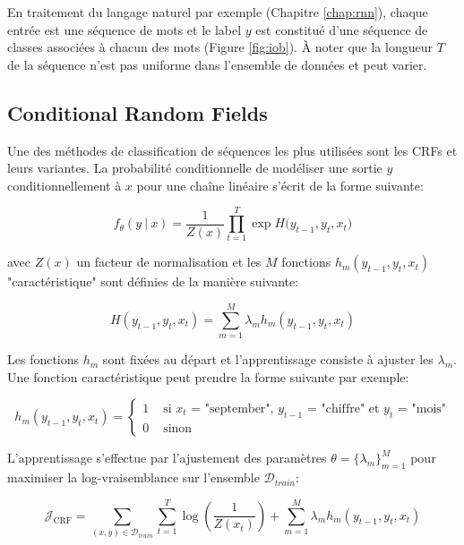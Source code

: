 En traitement du langage naturel par exemple (Chapitre \ref{chap:rnn}), chaque
entrée est une séquence de mots et le label $y$ est constitué d'une séquence de
classes associées à chacun des mots (Figure \ref{fig:iob}). À noter que la
longueur $T$ de la séquence n'est pas uniforme dans l'ensemble de données et
peut varier.

\subsection{Conditional Random Fields}

Une des méthodes de classification de séquences les plus utilisées sont les CRFs \citep{rnn6} et leurs variantes.
La probabilité conditionnelle de modéliser une sortie $y$ conditionnellement à
$x$ pour une chaîne linéaire s'écrit de la forme suivante:

\begin{equation}
f_{\theta}(y~\vert~x) = \frac{1}{Z(x)}\prod_{t=1}^{T}\exp{H(y_{t-1}, y_{t}, x_{t}})
\end{equation}

avec $Z(x)$ un facteur de normalisation et les $M$ fonctions $h_{m}(y_{t-1},
y_{t}, x_{t})$ "caractéristique" sont définies de la manière suivante:

\begin{equation}
H(y_{t-1}, y_{t}, x_{t}) = \sum_{m=1}^{M}\lambda_{m}h_{m}(y_{t-1}, y_{t}, x_{t})
\end{equation}

Les fonctions $h_{m}$ sont fixées au départ et l'apprentissage consiste à
ajuster les $\lambda_{m}$. Une fonction caractéristique peut prendre la forme
suivante par exemple:

\begin{equation}
h_{m}(y_{t-1}, y_{t}, x_{t}) = 
\left\{
\begin{split}
1 &  \textrm{~si $x_{t}$ = "september", $y_{t-1}$ = "chiffre" et $y_{t}$ = "mois"} \\ 
0 & \textrm{~sinon}
\end{split}
\right.
\end{equation}

L'apprentissage s'effectue par l'ajustement des paramètres $\theta=\lbrace
\lambda_m \rbrace_{m=1}^{M}$ pour maximiser la log-vraisemblance sur l'ensemble
$\mathcal{D}_{train}$:

\begin{equation}
\mathcal{J}_{\textrm{CRF}} =\sum_{(x,y)\in\mathcal{D}_{train}} \sum_{t=1}^{T} \log (\dfrac{1}{Z(x_{t})}) + \sum_{m=1}^{M} \lambda_{m} h_{m}(y_{t-1}, y_{t}, x_{t})
\label{eq:loglikecrf}
\end{equation}

